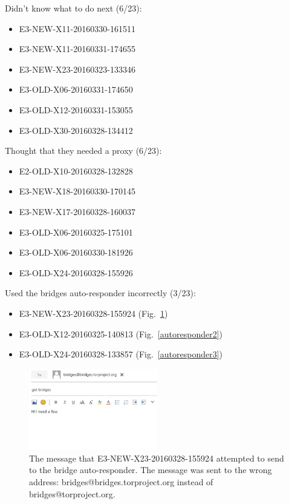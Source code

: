 \documentclass[USenglish,oneside,twocolumn]{article}
\begin{document}
Didn't know what to do next (6/23): 
\begin{itemize}
\item E3-NEW-X11-20160330-161511
\item E3-NEW-X11-20160331-174655
\item E3-NEW-X23-20160323-133346
\item E3-OLD-X06-20160331-174650
\item E3-OLD-X12-20160331-153055
\item E3-OLD-X30-20160328-134412
\end{itemize} 

Thought that they needed a proxy (6/23): 
\begin{itemize}
\item E2-OLD-X10-20160328-132828
\item E3-NEW-X18-20160330-170145
\item E3-NEW-X17-20160328-160037
\item E3-OLD-X06-20160325-175101
\item E3-OLD-X06-20160330-181926
\item E3-OLD-X24-20160328-155926
\end{itemize} 

Used the bridges auto-responder incorrectly (3/23): 
\begin{itemize}
\item E3-NEW-X23-20160328-155924 (Fig.~\ref{autoresponder1})
\item E3-OLD-X12-20160325-140813 (Fig.~\ref{autoresponder2})
\item E3-OLD-X24-20160328-133857 (Fig.~\ref{autoresponder3})
\end{itemize}   

\begin{figure}[h]
\includegraphics[width=0.5\textwidth]{../experiment/processing/failed-participants/20160325-140813-bridgeresponder-redacted.png}
\caption{The message that E3-NEW-X23-20160328-155924 attempted to send to the bridge auto-responder. The message was sent to the wrong address: bridges@bridges.torproject.org instead of bridges@torproject.org.}
\label{autoresponder1}
\end{figure} 
\end{document}
